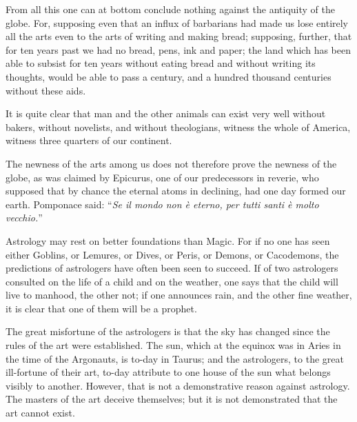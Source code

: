 From all this one can at bottom conclude nothing against the antiquity
of the globe. For, supposing even that an influx of barbarians had made
us lose entirely all the arts even to the arts of writing and making
bread; supposing, further, that for ten years past we had no bread,
pens, ink and paper; the land which has been able to subsist for ten
years without eating bread and without writing its thoughts, would be
able to pass a century, and a hundred thousand centuries without these
aids.

It is quite clear that man and the other animals can exist very well
without bakers, without novelists, and without theologians, witness the
whole of America, witness three quarters of our continent.

The newness of the arts among us does not therefore prove the newness of
the globe, as was claimed by Epicurus, one of our predecessors in
reverie, who supposed that by chance the eternal atoms in declining, had
one day formed our earth. Pomponace said: \enquote{\textit{Se il mondo non è eterno,
per tutti santi è molto vecchio.}}






Astrology may rest on better foundations than Magic. For if no one has
seen either Goblins, or Lemures, or Dives, or Peris, or Demons, or
Cacodemons, the predictions of astrologers have often been seen to
succeed. If of two astrologers consulted on the life of a child and on
the weather, one says that the child will live to manhood, the other
not; if one announces rain, and the other fine weather, it is clear that
one of them will be a prophet.

The great misfortune of the astrologers is that the sky has changed
since the rules of the art were established. The sun, which at the
equinox was in Aries in the time of the Argonauts, is to-day in Taurus;
and the astrologers, to the great ill-fortune of their art, to-day
attribute to one house of the sun what belongs visibly to another.
However, that is not a demonstrative reason against astrology. The
masters of the art deceive themselves; but it is not demonstrated that
the art cannot exist.

